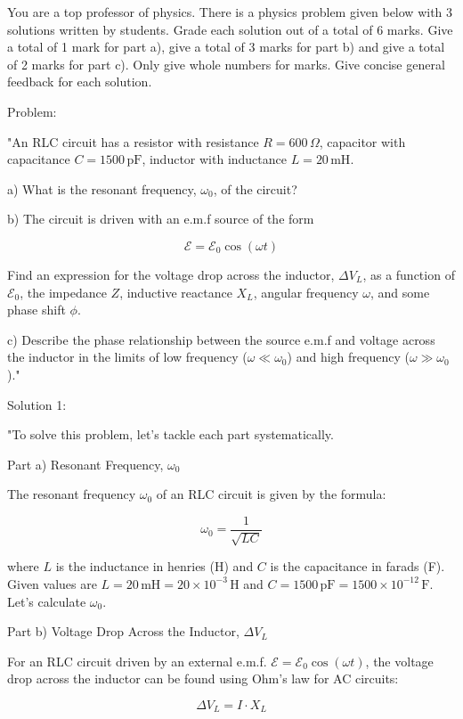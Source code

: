 You are a top professor of physics. There is a physics problem given below with 3 solutions written by students. Grade each solution out of a total of 6 marks. Give a total of 1 mark for part a), give a total of 3 marks for part b) and give a total of 2 marks for part c). Only give whole numbers for marks. Give concise general feedback for each solution. 

Problem:

"An RLC circuit has a resistor with resistance \( R = 600 \, \Omega \), capacitor with capacitance \( C = 1500 \, \text{pF} \), inductor with inductance \( L = 20 \, \text{mH} \).

a) What is the resonant frequency, \( \omega_{0} \), of the circuit?

b) The circuit is driven with an e.m.f source of the form 

\[ \mathcal{E} = \mathcal{E}_{0} \cos(\omega t) \]

Find an expression for the voltage drop across the inductor, \( \Delta V_{L} \), as a function of \( \mathcal{E}_{0} \), the impedance \( Z \), inductive reactance \( X_{L} \), angular frequency \( \omega \), and some phase shift \( \phi \).

c) Describe the phase relationship between the source e.m.f and voltage across the inductor in the limits of low frequency (\( \omega \ll \omega_{0} \)) and high frequency (\( \omega \gg \omega_{0} \))."

Solution 1:

"To solve this problem, let's tackle each part systematically.

Part a) Resonant Frequency, \( \omega_{0} \)

The resonant frequency \(\omega_{0}\) of an RLC circuit is given by the formula:

\[ \omega_{0} = \frac{1}{\sqrt{LC}} \]

where \(L\) is the inductance in henries (H) and \(C\) is the capacitance in farads (F). Given values are \(L = 20 \, \text{mH} = 20 \times 10^{-3} \, \text{H}\) and \(C = 1500 \, \text{pF} = 1500 \times 10^{-12} \, \text{F}\). Let's calculate \(\omega_{0}\).

Part b) Voltage Drop Across the Inductor, \( \Delta V_{L} \)

For an RLC circuit driven by an external e.m.f. \(\mathcal{E} = \mathcal{E}_{0} \cos(\omega t)\), the voltage drop across the inductor can be found using Ohm's law for AC circuits:

\[ \Delta V_{L} = I \cdot X_{L} \]

